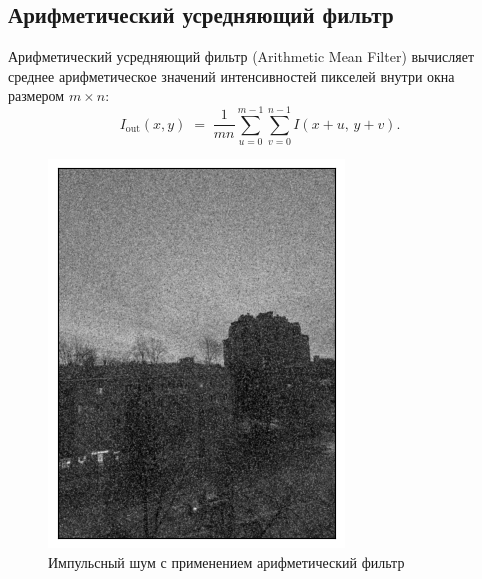 \documentclass[a4paper,12pt]{article}
\begin{document}
\subsection{Арифметический усредняющий фильтр}
Арифметический усредняющий фильтр (Arithmetic Mean Filter) вычисляет среднее арифметическое значений интенсивностей пикселей внутри окна размером \(m \times n\):
\begin{equation}
I_{\text{out}}(x,y) \;=\; \frac{1}{mn} \sum_{u=0}^{m-1} \sum_{v=0}^{n-1} I(x+u,\,y+v).
\end{equation}
\begin{figure}[H]
    \begin{minipage}{0.49\textwidth}
        \centering \includegraphics[width=\textwidth]{results/lpf_sap_1.png}
        \caption{Импульсный шум с применением арифметический фильтр}
    \end{minipage}\hfill
    \begin{minipage}{0.49\textwidth}

\end{minipage}
\end{figure}
\end{document}
